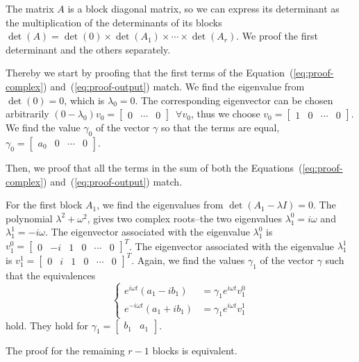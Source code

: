 \documentclass[letterpaper,10pt,conference]{ieeeconf}
\theoremstyle{definition}
\begin{document}
The matrix $A$ is a block diagonal matrix, so we can express its determinant as the multiplication of the determinants of its blocks $\det{(A)}=\det{(0)}\times\det{(A_1)}\times\cdots\times\det{(A_r)}$. We proof the first determinant and the others separately.

Thereby we start by proofing that the first terms of the Equation~(\ref{eq:proof-complex}) and~(\ref{eq:proof-output}) match. We find the eigenvalue from $\det(0)=0$, which is $\lambda_0=0$. The corresponding eigenvector can be chosen arbitrarily $(0-\lambda_0)v_0=\begin{bmatrix} 0 & \cdots & 0 \end{bmatrix}\,\,\,\forall v_0$, thus we choose $v_0=\begin{bmatrix}1 & 0 & \cdots & 0\end{bmatrix}$. We find the value $\gamma_0$ of the vector $\gamma$ so that the terms are equal, $\gamma_0=\begin{bmatrix}a_0 & 0 & \cdots & 0\end{bmatrix}$. 

Then, we proof that all the terms in the sum of both the Equations~(\ref{eq:proof-complex}) and~(\ref{eq:proof-output}) match. 

For the first block $A_1$, we find the eigenvalues from $\det(A_1-\lambda I)=0$. The polynomial $\lambda^2+\omega^2$, gives two complex roots--the two eigenvalues $\lambda_1^0=i\omega$ and $\lambda_1^1=-i\omega$. The eigenvector associated with the eigenvalue $\lambda_1^0$ is $v_1^0=\begin{bmatrix}0 & -i&1&0&\cdots&0\end{bmatrix}^T$. The eigenvector associated with the eigenvalue $\lambda_1^1$ is $v_1^1=\begin{bmatrix}0&i&1&0&\cdots&0\end{bmatrix}^T$. Again, we find the values $\gamma_1$ of the vector $\gamma$ such that the equivalences 
\begin{equation*}\begin{cases}
  e^{i\omega t}(a_1-ib_1)&=\gamma_1 e^{i\omega t}v_1^0\\
  e^{-i\omega t}(a_1+ib_1)&=\gamma_1 e^{i\omega t}v_1^1
\end{cases}\end{equation*}
hold. They hold for $\gamma_1=\begin{bmatrix}b_1&a_1\end{bmatrix}$. 

The proof for the remaining $r-1$ blocks is equivalent.
\end{document}
